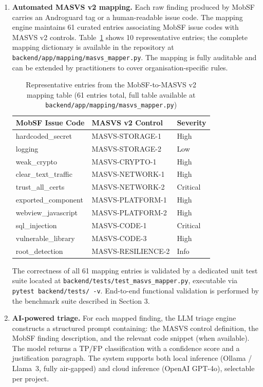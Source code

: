 \documentclass[preprint,12pt,a4paper]{elsarticle}
\begin{document}
\begin{enumerate}
  \item \textbf{Automated MASVS v2 mapping.} Each raw finding produced by
    MobSF carries an Androguard tag or a human-readable issue code. The
    mapping engine maintains 61 curated entries associating MobSF issue codes with MASVS v2 controls. Table~\ref{tab:mapping_samples} shows 10 representative entries; the complete mapping dictionary is available in the repository at \texttt{backend/app/mapping/masvs\_mapper.py}. The mapping is fully auditable and can be extended by practitioners to cover organisation-specific rules.

\begin{table}[h]
\caption{Representative entries from the MobSF-to-MASVS v2 mapping table (61 entries total, full table available at \texttt{backend/app/mapping/masvs\_mapper.py})}
\label{tab:mapping_samples}
\begin{tabular}{lll}
\hline
MobSF Issue Code & MASVS v2 Control & Severity \\
\hline
hardcoded\_secret & MASVS-STORAGE-1 & High \\
logging & MASVS-STORAGE-2 & Low \\
weak\_crypto & MASVS-CRYPTO-1 & High \\
clear\_text\_traffic & MASVS-NETWORK-1 & High \\
trust\_all\_certs & MASVS-NETWORK-2 & Critical \\
exported\_component & MASVS-PLATFORM-1 & High \\
webview\_javascript & MASVS-PLATFORM-2 & High \\
sql\_injection & MASVS-CODE-1 & Critical \\
vulnerable\_library & MASVS-CODE-3 & High \\
root\_detection & MASVS-RESILIENCE-2 & Info \\
\hline
\end{tabular}
\end{table}

The correctness of all 61 mapping entries is validated by a dedicated unit test suite located at \texttt{backend/tests/test\_masvs\_mapper.py}, executable via \texttt{pytest backend/tests/ -v}. End-to-end functional validation is performed by the benchmark suite described in Section 3.

  \item \textbf{AI-powered triage.} For each mapped finding, the LLM
    triage engine constructs a structured prompt containing: the MASVS
    control definition, the MobSF finding description, and the relevant
    code snippet (when available). The model returns a TP/FP classification
    with a confidence score and a justification paragraph. The system
    supports both local inference (Ollama / Llama~3, fully air-gapped) and
    cloud inference (OpenAI GPT-4o), selectable per project.


\end{enumerate}
\end{document}
